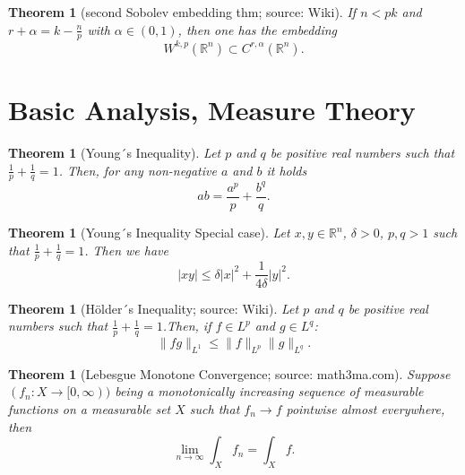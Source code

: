 \documentclass[12pt,a4paper]{article}
\newtheorem{thm}[definition]{Theorem}
\newcommand{\Rn}{\mathbb{R}^n}
\begin{document}
\begin{thm}[second Sobolev embedding thm; source: Wiki]
If $n<pk$ and $r+\alpha=k-\frac{n}{p}$ with $\alpha \in (0,1)$, then one has the embedding
\begin{equation}
W^{k,p}(\mathbb{R}^n) \subset C^{r,\alpha}(\mathbb{R}^n).
\end{equation}
\end{thm}


\section{Basic Analysis, Measure Theory}

\begin{thm}[Young´s Inequality]
Let $p$ and $q$ be positive real numbers such that $\frac{1}{p} + \frac{1}{q} = 1$. Then, for any non-negative $a$ and $b$ it holds
\begin{equation}
ab=\frac{a^p}{p}+\frac{b^q}{q}.
\end{equation}
\end{thm}

\begin{thm}[Young´s Inequality Special case]
Let $x,y\in \Rn$, $\delta > 0$, $p,q>1$ such that $\frac{1}{p} + \frac{1}{q} = 1$. Then we have
\begin{equation}
\vert xy\vert \leq \delta \vert x \vert^2 + \frac{1}{4\delta}\vert y \vert^2.
\end{equation}
\end{thm}

\begin{thm} [Hölder´s Inequality; source: Wiki]
Let $p$ and $q$ be positive real numbers such that $\frac{1}{p} + \frac{1}{q} = 1$.Then, if $f \in L^p$ and $g\in L^q$:
\begin{equation}
\lVert fg \rVert_{L^1} \leq \lVert f \rVert_{L^p} \lVert g \rVert_{L^q}.
\end{equation}
\end{thm}

\begin{thm}[Lebesgue Monotone Convergence; source: math3ma.com]
Suppose $(f_n:X\rightarrow [0,\infty))$ being a monotonically increasing sequence of measurable functions on a measurable set $X$ such that $f_n\rightarrow f$ pointwise almost everywhere, then
\begin{equation}
\lim_{n\rightarrow\infty} \int_X f_n = \int_X f.
\end{equation}
\end{thm}
\end{document}
